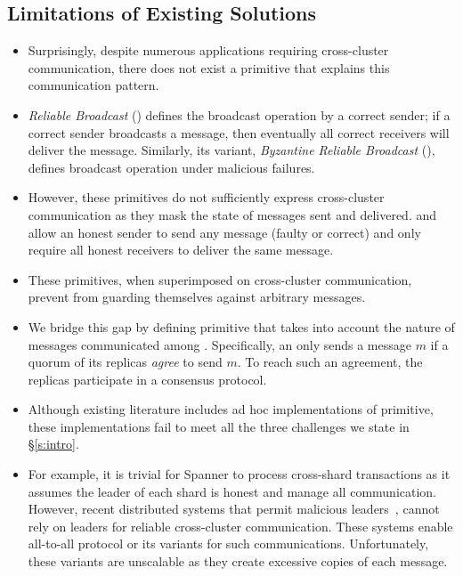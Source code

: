 \subsection{Limitations of Existing Solutions}
\begin{itemize}[wide]
\item Surprisingly, despite numerous applications requiring cross-cluster communication, 
there does not exist a primitive that explains this communication pattern. 

\item {\em Reliable Broadcast} () defines the broadcast operation by a correct sender; 
if a correct sender broadcasts a message, then eventually all correct receivers will deliver the message. 
Similarly, its variant, {\em Byzantine Reliable Broadcast} (), defines 
broadcast operation under malicious failures.

\item However, these primitives do not sufficiently express cross-cluster communication 
as they mask the state of messages sent and delivered.
 and  allow an honest sender to send any message (faulty or correct) and 
only require all honest receivers to deliver the same message.

\item These primitives, when superimposed on cross-cluster communication, prevent  
from guarding themselves against arbitrary messages.

\item We bridge this gap by defining \CCC{} primitive that takes into account the nature of 
messages communicated among .
Specifically, an \RSM{} only sends a message $m$ if a quorum of its replicas {\em agree}
to send $m$.
To reach such an agreement, the replicas participate in a consensus protocol.


\item Although existing literature includes ad hoc implementations of \CCC{} primitive,
these implementations fail to meet all the three challenges we state in \S\ref{s:intro}.

\item For example, it is trivial for Spanner to process cross-shard transactions as it 
assumes the leader of each shard is honest and manage all communication. 
However, recent distributed systems that permit malicious leaders~\cite{aaa}, cannot rely on 
leaders for reliable cross-cluster communication.
These systems enable {all-to-all} protocol or its variants for such communications.
Unfortunately, these variants are unscalable as they create excessive copies of each message.


\end{itemize}
